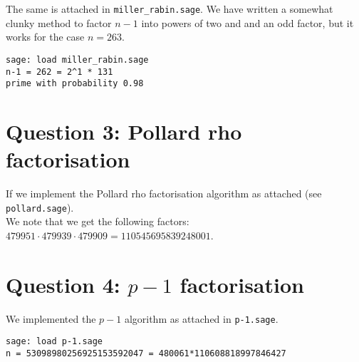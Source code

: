 \documentclass{article}
\begin{document}
The same is attached in \verb|miller_rabin.sage|.
We have written a somewhat clunky method to factor $n-1$ into powers of two and and an odd factor, but it works for the case $n=263$.

\begin{verbatim}
sage: load miller_rabin.sage
n-1 = 262 = 2^1 * 131 
prime with probability 0.98
\end{verbatim}

\section{Question 3: Pollard rho factorisation}

If we implement the Pollard rho factorisation algorithm as attached (see \verb|pollard.sage|). \\
\noindent
We note that we get the following factors: $479951 \cdot 479939 \cdot 479909 = 110545695839248001$.



\section{Question 4: $p - 1$ factorisation}
We implemented the $p-1$ algorithm as attached in \verb|p-1.sage|.
\begin{verbatim}
sage: load p-1.sage
n = 53098980256925153592047 = 480061*110608818997846427
\end{verbatim}
\end{document}
